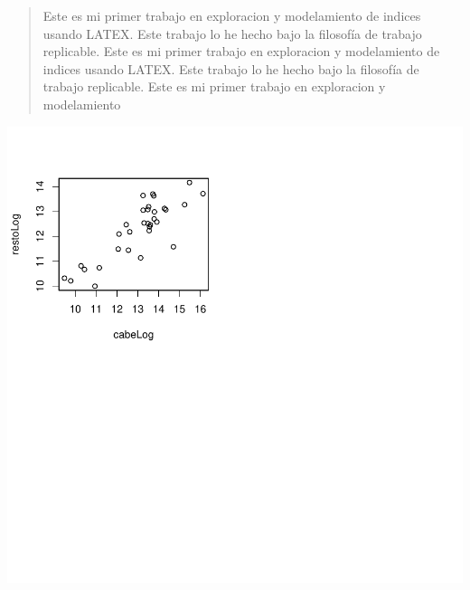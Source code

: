 \documentclass{article}
\begin{document}
\begin{abstract}
Este es mi primer trabajo en exploracion y modelamiento de indices usando LATEX. Este trabajo lo he hecho bajo la filosofía de trabajo replicable. Este es mi primer trabajo en exploracion y modelamiento de indices usando LATEX. Este trabajo lo he hecho bajo la filosofía de trabajo replicable. Este es mi primer trabajo en exploracion y modelamiento 

\end{abstract}
\centering
\includegraphics{ProyectoFINAL-barplots4}


\centering
\end{document}
